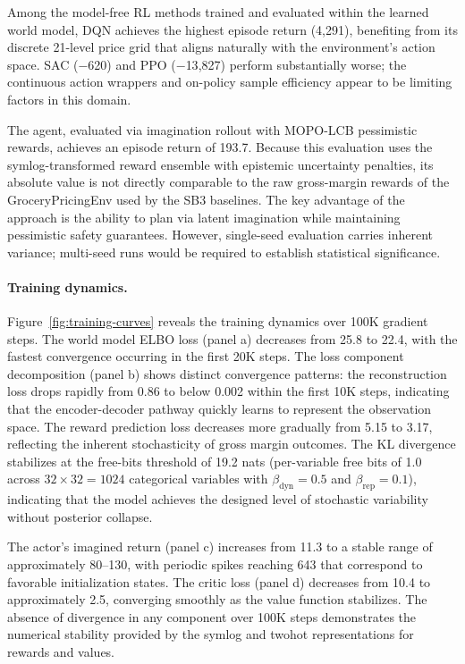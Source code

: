 Among the model-free RL methods trained and evaluated within the learned world model, DQN achieves the highest episode return (4{,}291), benefiting from its discrete 21-level price grid that aligns naturally with the environment's action space. SAC ($-$620) and PPO ($-$13{,}827) perform substantially worse; the continuous action wrappers and on-policy sample efficiency appear to be limiting factors in this domain.

The \dreamprice{} agent, evaluated via imagination rollout with MOPO-LCB pessimistic rewards, achieves an episode return of 193.7. Because this evaluation uses the symlog-transformed reward ensemble with epistemic uncertainty penalties, its absolute value is not directly comparable to the raw gross-margin rewards of the GroceryPricingEnv used by the SB3 baselines. The key advantage of the \dreamprice{} approach is the ability to plan via latent imagination while maintaining pessimistic safety guarantees. However, single-seed evaluation carries inherent variance; multi-seed runs would be required to establish statistical significance.

\paragraph{Training dynamics.} Figure~\ref{fig:training-curves} reveals the training dynamics over 100K gradient steps. The world model ELBO loss (panel a) decreases from 25.8 to 22.4, with the fastest convergence occurring in the first 20K steps. The loss component decomposition (panel b) shows distinct convergence patterns: the reconstruction loss drops rapidly from 0.86 to below 0.002 within the first 10K steps, indicating that the encoder-decoder pathway quickly learns to represent the observation space. The reward prediction loss decreases more gradually from 5.15 to 3.17, reflecting the inherent stochasticity of gross margin outcomes. The KL divergence stabilizes at the free-bits threshold of 19.2 nats (per-variable free bits of 1.0 across $32 \times 32 = 1024$ categorical variables with $\beta_\text{dyn} = 0.5$ and $\beta_\text{rep} = 0.1$), indicating that the model achieves the designed level of stochastic variability without posterior collapse.

The actor's imagined return (panel c) increases from 11.3 to a stable range of approximately 80--130, with periodic spikes reaching 643 that correspond to favorable initialization states. The critic loss (panel d) decreases from 10.4 to approximately 2.5, converging smoothly as the value function stabilizes. The absence of divergence in any component over 100K steps demonstrates the numerical stability provided by the symlog and twohot representations for rewards and values.

